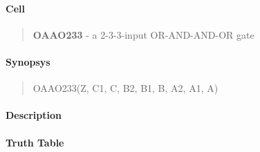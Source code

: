\label{OAAO233}
\paragraph{Cell}
\begin{quote}
    \textbf{OAAO233} - a 2-3-3-input OR-AND-AND-OR gate
\end{quote}

\paragraph{Synopsys}
\begin{quote}
    OAAO233(Z, C1, C, B2, B1, B, A2, A1, A)
\end{quote}

\paragraph{Description}

%

\paragraph{Truth Table}
%

